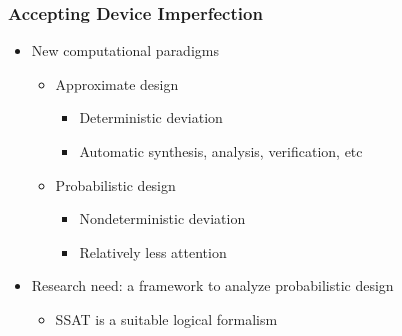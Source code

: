 \begin{frame}
      \frametitle{Accepting Device Imperfection}
      \begin{itemize}
            \item New computational paradigms
                  \pause
                  \begin{itemize}
                        \item Approximate design~\cite{Venkatesan2011ApproxDesign}
                              \pause
                              \begin{itemize}
                                    \item Deterministic deviation
                                          \pause
                                    \item Automatic synthesis, analysis, verification, etc
                                          \pause
                              \end{itemize}
                        \item Probabilistic design~\cite{Chakrapani2006ProbDesign}
                              \pause
                              \begin{itemize}
                                    \item Nondeterministic deviation
                                          \pause
                                    \item Relatively less attention
                                          \pause
                              \end{itemize}
                  \end{itemize}
            \item \alert{Research need: a framework to analyze probabilistic design}
                  \pause
                  \begin{itemize}
                        \item SSAT is a suitable logical formalism
                  \end{itemize}
      \end{itemize}
\end{frame}

